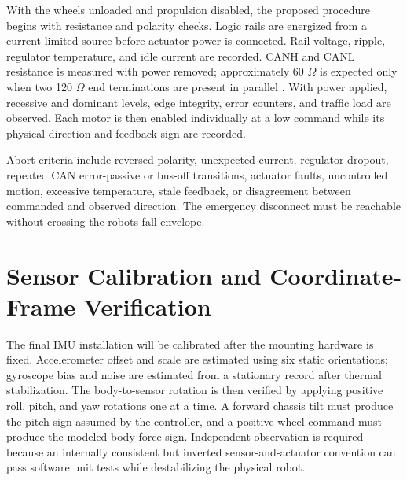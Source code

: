 With the wheels unloaded and propulsion disabled, the proposed procedure
begins with resistance and polarity checks. Logic rails are energized
from a current-limited source before actuator power is connected. Rail
voltage, ripple, regulator temperature, and idle current are recorded.
CANH and CANL resistance is measured with power removed; approximately
60 \ensuremath{\Omega} is expected only when two 120 \ensuremath{\Omega} end terminations are present in
parallel \cite{ti2026tida01238}. With power applied, recessive and dominant levels,
edge integrity, error counters, and traffic load are observed. Each
motor is then enabled individually at a low command while its physical
direction and feedback sign are recorded.

Abort criteria include reversed polarity, unexpected current, regulator
dropout, repeated CAN error-passive or bus-off transitions, actuator
faults, uncontrolled motion, excessive temperature, stale feedback, or
disagreement between commanded and observed direction. The emergency
disconnect must be reachable without crossing the
robot\textquotesingle s fall envelope.

\section{Sensor Calibration and Coordinate-Frame Verification}\label{sensor-calibration-and-coordinate-frame-verification}

The final IMU installation will be calibrated after the mounting
hardware is fixed. Accelerometer offset and scale are estimated using
six static orientations; gyroscope bias and noise are estimated from a
stationary record after thermal stabilization. The body-to-sensor
rotation is then verified by applying positive roll, pitch, and yaw
rotations one at a time. A forward chassis tilt must produce the pitch
sign assumed by the controller, and a positive wheel command must
produce the modeled body-force sign. Independent observation is required
because an internally consistent but inverted sensor-and-actuator
convention can pass software unit tests while destabilizing the physical
robot.

